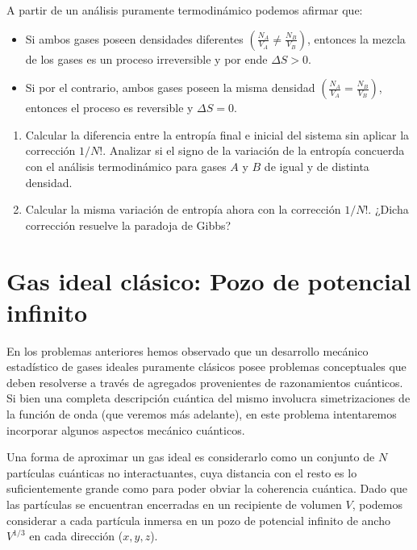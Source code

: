 \documentclass[a4paper,11pt]{article}
\begin{document}
A partir de un análisis puramente termodinámico podemos afirmar que:

\begin{itemize}

\item{Si ambos gases poseen densidades diferentes
      $\left( \frac{N_A}{V_A} \neq \frac{N_B}{V_B} \right)$, entonces la
      mezcla de los gases es un proceso irreversible y por ende
      $ \Delta S > 0 $.
      }

\item{Si por el contrario, ambos gases poseen la misma densidad
      $\left( \frac{N_A}{V_A} = \frac{N_B}{V_B} \right)$, entonces
      el proceso es reversible y $ \Delta S = 0 $.
      }

\end{itemize}

\begin{enumerate}[label=(\alph*),
                  leftmargin=2\parindent,
                  rightmargin=2\parindent]

    \item{Calcular la diferencia entre la entropía final e inicial del
          sistema sin aplicar la corrección $1/N!$.
          Analizar si el signo de la variación de la entropía
          concuerda con el análisis termodinámico para gases $A$ y $B$ de
          igual y de distinta densidad.}

    \item{Calcular la misma variación de entropía ahora con la
          corrección $1/N!$. ¿Dicha corrección resuelve la paradoja
          de Gibbs?}

\end{enumerate}


\section{Gas ideal clásico: Pozo de potencial infinito}

En los problemas anteriores hemos observado que un desarrollo mecánico
estadístico de gases ideales puramente clásicos posee problemas
conceptuales que deben resolverse a través de agregados provenientes
de razonamientos cuánticos.
Si bien una completa descripción cuántica del mismo involucra
simetrizaciones de la función de onda (que veremos más adelante), en
este problema intentaremos incorporar algunos aspectos mecánico
cuánticos.

Una forma de aproximar un gas ideal es considerarlo como un conjunto de
$N$ partículas cuánticas no interactuantes, cuya distancia con el resto
es lo suficientemente grande como para poder obviar la coherencia
cuántica. Dado que las partículas se encuentran encerradas en un
recipiente de volumen $V$, podemos considerar a cada partícula inmersa
en un pozo de potencial infinito de ancho $V^{1/3}$ en cada dirección
($x, y, z$).
\end{document}
